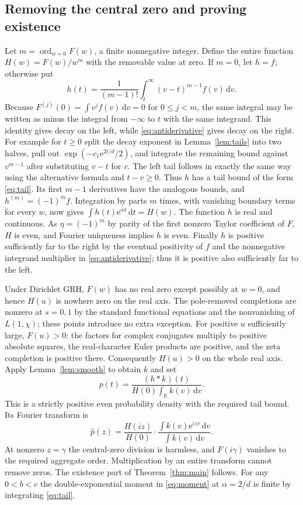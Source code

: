 \documentclass[11pt]{article}
\theoremstyle{remark}\newtheorem{remark}[theorem]{Remark}
\newcommand{\R}{\mathbb R}\newcommand{\C}{\mathbb C}\newcommand{\dd}{\,\mathrm d}
\newcommand{\ee}{\mathrm e}\newcommand{\abs}[1]{\lvert#1\rvert}
\DeclareMathOperator{\ord}{ord}
\begin{document}
\subsection{Removing the central zero and proving existence}
Let $m=\ord_{w=0}F(w)$, a finite nonnegative integer. Define the entire function $H(w)=F(w)/w^m$ with the removable value at zero. If $m=0$, let $h=f$; otherwise put
\begin{equation}\label{eq:antiderivative}
 h(t)=\frac1{(m-1)!}\int_t^\infty (v-t)^{m-1}f(v)\dd v.
\end{equation}
Because $F^{(j)}(0)=\int v^j f(v)\dd v=0$ for $0\le j<m$, the same integral may be written as minus the integral from $-\infty$ to $t$ with the same integrand. This identity gives decay on the left, while \eqref{eq:antiderivative} gives decay on the right. For example for $t\ge0$ split the decay exponent in Lemma~\ref{lem:tails} into two halves, pull out $\exp(-c_1\ee^{2t/d}/2)$, and integrate the remaining bound against $v^{m-1}$ after substituting $v-t$ for $v$. The left tail follows in exactly the same way using the alternative formula and $t-v\ge0$. Thus $h$ has a tail bound of the form \eqref{eq:tail}. Its first $m-1$ derivatives have the analogous bounds, and $h^{(m)}=(-1)^m f$. Integration by parts $m$ times, with vanishing boundary terms for every $w$, now gives $\int h(t)\ee^{wt}\dd t=H(w)$. The function $h$ is real and continuous. As $\eta=(-1)^m$ by parity of the first nonzero Taylor coefficient of $F$, $H$ is even, and Fourier uniqueness implies $h$ is even. Finally $h$ is positive sufficiently far to the right by the eventual positivity of $f$ and the nonnegative integrand multiplier in \eqref{eq:antiderivative}; thus it is positive also sufficiently far to the left.

Under Dirichlet GRH, $F(w)$ has no real zero except possibly at $w=0$, and hence $H(u)$ is nowhere zero on the real axis. The pole-removed completions are nonzero at $s=0,1$ by the standard functional equations and the nonvanishing of $L(1,\chi)$; these points introduce no extra exception. For positive $u$ sufficiently large, $F(u)>0$: the factors for complex conjugates multiply to positive absolute squares, the real-character Euler products are positive, and the zeta completion is positive there. Consequently $H(u)>0$ on the whole real axis. Apply Lemma~\ref{lem:smooth} to obtain $k$ and set
\begin{equation}\label{eq:construction}
 p(t)=\frac{(h*k)(t)}{H(0)\int_\R k(v)\dd v}.
\end{equation}
This is a strictly positive even probability density with the required tail bound. Its Fourier transform is
\[
 \widehat p(z)=\frac{H(iz)}{H(0)}\cdot\frac{\int k(v)\ee^{izv}\dd v}{\int k(v)\dd v}.
\]
At nonzero $z=\gamma$ the central-zero division is harmless, and $F(i\gamma)$ vanishes to the required aggregate order. Multiplication by an entire transform cannot remove zeros. The existence part of Theorem~\ref{thm:main} follows. For any $0<b<c$ the double-exponential moment in \eqref{eq:moment} at $\alpha=2/d$ is finite by integrating \eqref{eq:tail}.
\end{document}
